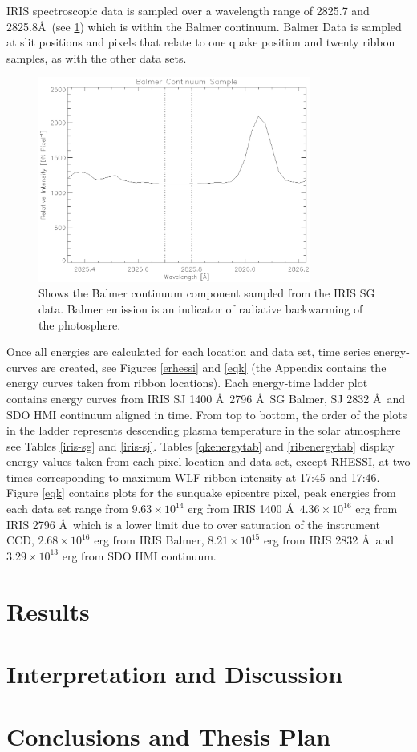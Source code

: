 IRIS spectroscopic data is sampled over a wavelength range of 2825.7 and 2825.8\AA\ (see \ref{balmercontinuum}) which is within the Balmer continuum. Balmer Data is sampled at slit positions and pixels that relate to one quake position and twenty ribbon samples, as with the other data sets. 

\begin{figure}[H]
  \begin{center}
  \includegraphics[width=0.8\textwidth]{29-Mar-14-Balmer-Continuum}
  \end{center}
  \caption{Shows the Balmer continuum component sampled from the IRIS SG data. Balmer emission is an indicator of radiative backwarming of the photosphere. }\label{balmercontinuum}
\end{figure}


Once all energies are calculated for each location and data set, time series energy-curves are created, see Figures \ref{erhessi} and \ref{eqk} (the Appendix contains the energy curves taken from ribbon locations). Each energy-time ladder plot contains energy curves from IRIS SJ 1400 \AA\, 2796 \AA\, SG Balmer, SJ 2832 \AA\ and SDO HMI continuum aligned in time. From top to bottom, the order of the plots in the ladder represents descending plasma temperature in the solar atmosphere see Tables \ref{iris-sg} and \ref{iris-sj}. Tables \ref{qkenergytab} and \ref{ribenergytab} display energy values taken from each pixel location and data set, except RHESSI, at two times corresponding to maximum WLF ribbon intensity at 17:45 and 17:46. Figure \ref{eqk} contains plots for the sunquake epicentre pixel, peak energies from each data set range from $9.63{\times}10^{14}$ erg from IRIS 1400 \AA\, $4.36{\times}10^{16}$ erg from IRIS 2796 \AA\ which is a lower limit due to over saturation of the instrument CCD, $2.68{\times}10^{16}$ erg from IRIS Balmer, $8.21{\times}10^{15}$ erg from IRIS 2832 \AA\ and $3.29{\times}10^{13}$ erg from SDO HMI continuum.









\section{Results}
\section{Interpretation and Discussion}
\section{Conclusions and Thesis Plan}




